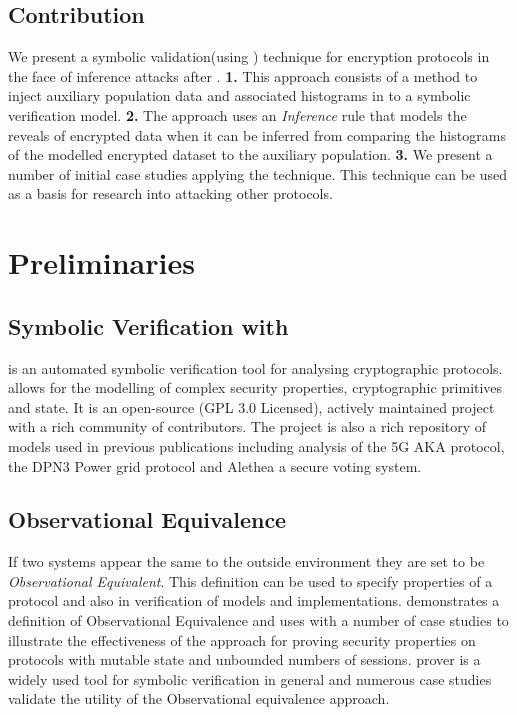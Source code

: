 \documentclass[journal]{IEEEtran}
\begin{document}


\subsection{Contribution}
We present a symbolic validation(using \tamarin{}) technique for encryption protocols in the face of inference attacks after \cite{InfrenceAttacks}. \textbf{1.} This approach consists of a method to inject auxiliary population data and associated histograms in to a symbolic verification model. \textbf{2.} The approach uses an \textit{Inference} rule that models the reveals of encrypted data when it can be inferred from comparing the histograms of the modelled encrypted dataset to the auxiliary population. \textbf{3.} We present a number of initial case studies applying the technique.
This technique can be used as a basis for research into attacking other protocols.

\section{Preliminaries}

\subsection{Symbolic Verification with \tamarin{}}
\tamarin{}\cite{Meier2013} is an automated symbolic verification tool for analysing cryptographic protocols. \tamarin{} allows for the modelling of complex security properties, cryptographic primitives and state. It is an open-source\cite{TamarinGithub} (GPL 3.0 Licensed), actively maintained project with a rich community of contributors. The project is also a rich repository of models used in previous publications including analysis of the 5G AKA protocol\cite{5GAKA}, the DPN3  Power grid protocol\cite{DNP3} and Alethea\cite{Alethea} a secure voting system.

\subsection{Observational Equivalence}
If two systems appear the same to the outside environment they are set to be \textit{Observational Equivalent}.
This definition can be used to specify properties of a protocol and also in verification of models and implementations. 
\cite{ObsEqvCCS15} demonstrates a definition of Observational Equivalence and uses \tamarin{} with a number of case studies to illustrate the effectiveness of the approach for proving security properties on protocols with mutable state and unbounded numbers of sessions. \tamarin{} \cite{Schmidt2012AutomatedProperties} prover is a widely used\cite{ARPKICCS14, Donenfeld} tool for symbolic verification in general and numerous case studies\cite{Norwegian,5GAKA} validate the utility of the Observational equivalence approach.
\end{document}
